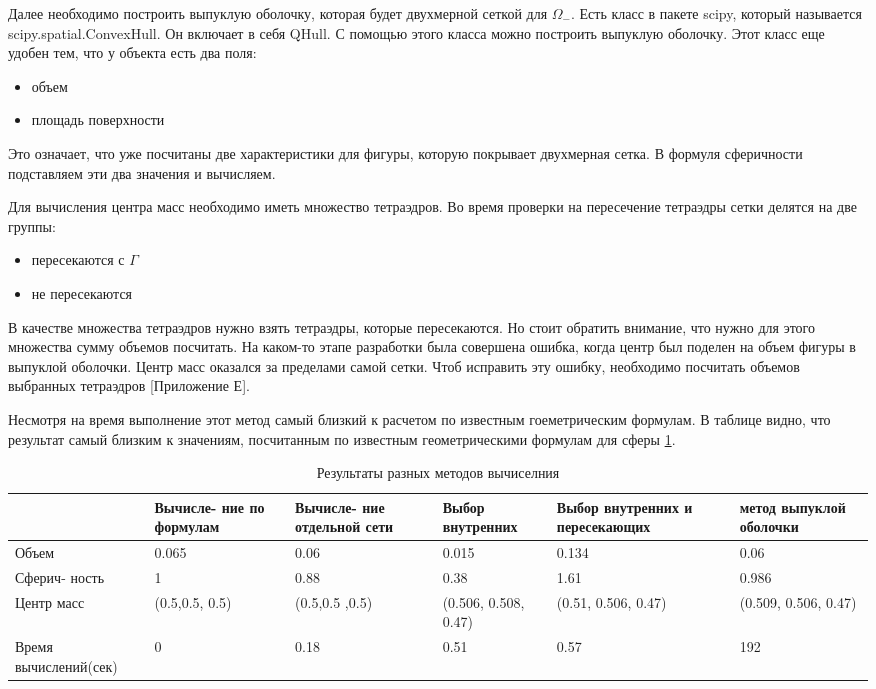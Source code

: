 Далее необходимо построить выпуклую оболочку, которая будет двухмерной сеткой для $\Omega_{-}$. Есть класс в пакете scipy, который называется\\ scipy.spatial.ConvexHull. Он включает в себя QHull. С помощью этого класса можно построить выпуклую оболочку. Этот класс еще удобен тем, что у объекта есть два поля: 
\begin{itemize}
    \item объем
    \item площадь поверхности
\end{itemize}
Это означает, что уже посчитаны две характеристики для фигуры, которую покрывает двухмерная сетка. В формуля сферичности подставляем эти два значения и вычисляем. 

Для вычисления центра масс необходимо иметь множество тетраэдров. Во время проверки на пересечение тетраэдры сетки делятся на две группы:
\begin{itemize}
    \item пересекаются с $\Gamma$
    \item не пересекаются
\end{itemize}
В качестве множества тетраэдров нужно взять тетраэдры, которые пересекаются. Но стоит обратить внимание, что нужно для этого множества сумму объемов посчитать. На каком-то этапе разработки была совершена ошибка, когда центр был поделен на объем фигуры в выпуклой оболочки. 
Центр масс оказался за пределами самой сетки. Чтоб исправить эту ошибку, необходимо посчитать объемов выбранных тетраэдров [Приложение Е]. 

Несмотря на время выполнение этот метод самый близкий к расчетом по известным гоеметрическим формулам. В таблице видно, что результат самый близким к значениям, посчитанным по известным геометрическими формулам для сферы \ref{table:1}.

\begin{table}[h]
\caption{Результаты разных методов вычиселния}
\label{table:1}
\centering 
\begin{tabular}{ |p{2cm}|p{2cm}|p{2cm}|p{2cm}| p{2cm}|p{2cm}| }
\hline
{}& Вычисле- ние по формулам
& Вычисле- ние отдельной сети & Выбор внутренних & Выбор внутренних и пересекающих & метод выпуклой оболочки \\
\hline
Объем & 0.065 & 0.06 & 0.015 & 0.134 & 0.06\\
\hline
Сферич- ность & 1 & 0.88 & 0.38 & 1.61 & 0.986\\
\hline
Центр масс & (0.5,0.5, 0.5) & (0.5,0.5 ,0.5)& (0.506, 0.508, 0.47)  &  (0.51, 0.506, 0.47) &  (0.509, 0.506, 0.47) \\
\hline
Время вычислений(сек) & 0 & 0.18 & 0.51 & 0.57 & 192 \\
\hline
\end{tabular}
\end{table}


